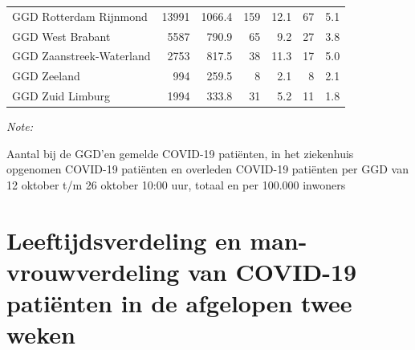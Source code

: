 \documentclass[
  english,
  man,floatsintext]{apa6}
\begin{document}
\begin{table}[H]
\begin{threeparttable}
\begin{tabular}{lrrrrrr}
GGD Rotterdam Rijnmond & 13991 & 1066.4 & 159 & 12.1 & 67 & 5.1\\
GGD West Brabant & 5587 & 790.9 & 65 & 9.2 & 27 & 3.8\\
GGD Zaanstreek-Waterland & 2753 & 817.5 & 38 & 11.3 & 17 & 5.0\\
GGD Zeeland & 994 & 259.5 & 8 & 2.1 & 8 & 2.1\\
GGD Zuid Limburg & 1994 & 333.8 & 31 & 5.2 & 11 & 1.8\\
\bottomrule
\end{tabular}
\begin{tablenotes}
\item \textit{Note: } 
\item Aantal bij de GGD’en gemelde COVID-19 patiënten, in het ziekenhuis opgenomen COVID-19 patiënten en overleden COVID-19 patiënten per GGD van 12 oktober t/m 26 oktober 10:00 uur, totaal en per 100.000 inwoners
\end{tablenotes}
\end{threeparttable}
\endgroup{}
\end{table}

\newpage

\hypertarget{leeftijdsverdeling-en-man-vrouwverdeling-van-covid-19-patiuxebnten-in-de-afgelopen-twee-weken}{%
\section{Leeftijdsverdeling en man-vrouwverdeling van COVID-19 patiënten in de afgelopen twee weken}\label{leeftijdsverdeling-en-man-vrouwverdeling-van-covid-19-patiuxebnten-in-de-afgelopen-twee-weken}}
\end{document}
